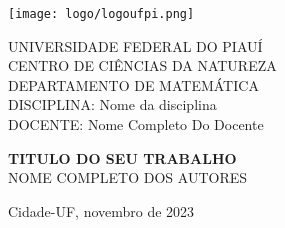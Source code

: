 \documentclass[12pt]{article}
\begin{document}
\begin{titlepage}
    \begin{center}

        \texttt{[image: logo/logoufpi.png]}
        
        UNIVERSIDADE FEDERAL DO PIAUÍ\\
      
        CENTRO DE CIÊNCIAS DA NATUREZA\\
                
        DEPARTAMENTO DE MATEMÁTICA\\
        
        DISCIPLINA: Nome da disciplina\\
        
        DOCENTE: Nome Completo Do Docente
        

        \vfill %
        
        \textbf {TITULO DO SEU TRABALHO}\\
        
        NOME COMPLETO DOS AUTORES %
        
        \vfill
        
        Cidade-UF, novembro de 2023 %
        
    \end{center}
\end{titlepage}
\newpage
\tableofcontents
\newpage
\end{document}
